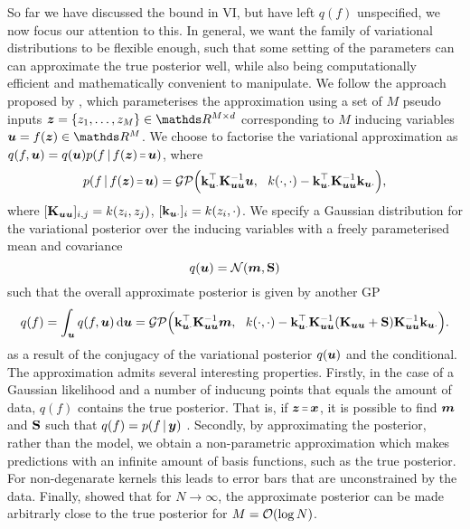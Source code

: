 So far we have discussed the bound in VI, but have left $q(f)$ unspecified, we now focus our attention to this. In general, we want the family of variational distributions to be flexible enough, such that some setting of the parameters can can approximate the true posterior well, while also being computationally efficient and mathematically convenient to manipulate. %
We follow the approach proposed by \citet{titsias2009}, which parameterises the approximation using a set of $M$ pseudo inputs $\vz = \{z_1, \ldots, z_M\} \in \Reals^{M \times d}$ corresponding to $M$ inducing variables $\vu = f(\vz) \in \Reals^M$. 
We choose to factorise the variational approximation as $q(f, \vu) = q(\vu) p(f\given f(\vz) \shorteq \vu)$, where
\begin{equation}
  p(f \given f(\vz) \shorteq \vu) = \GP\Big(\kux^\top \Kuu^{-1}\vu,\ \ k(\cdot, \cdot) -  \kux^\top \Kuu^{-1} \kux\Big), 
\end{equation}
where $[\mathbf{{K}}_{\bm{u} \bm{u}}]_{i,j} = k(z_i, z_j)$, $[\mathbf{k}_{\bm{u} \cdot}]_i = k(z_i, \cdot)$. We specify a Gaussian distribution for the variational posterior over the inducing variables with a freely parameterised mean and covariance
\begin{equation}
  q(\vu) = \NormDist{\vm, \MS}
\end{equation}
such that the overall approximate posterior is given by another GP
\begin{equation}
  q(f) = \int_{\bm{u}} q(f, \bm{u})\,\mathrm{d}{\bm{u}} = \mathcal{GP}\Big(\mathbf{k}_{\bm{u} \cdot}^\top \mathbf{{K}}_{\bm{u} \bm{u}}^{-1}\bm{m},\ \ k(\cdot, \cdot) -  \mathbf{k}_{\bm{u} \cdot}^\top \mathbf{{K}}_{\bm{u} \bm{u}}^{-1} (\mathbf{{K}}_{\bm{u} \bm{u}} + \mathbf{{S}})\mathbf{{K}}_{\bm{u} \bm{u}}^{-1} \mathbf{k}_{\bm{u} \cdot}\Big).
\end{equation}
as a result of the conjugacy of the variational posterior $q(\bm{u})$ and the conditional. 
The approximation admits several interesting properties. Firstly, in the case of a Gaussian likelihood and a number of inducung points that equals the amount of data, $q(f)$ contains the true posterior. That is, if $\vz \shorteq \vx$, it is possible to find $\bm{m}$ and $\mathbf{{S}}$ such that $q(f) = p(f \,|\, \bm{y})$ \citep{titsias2009}. Secondly, by approximating the posterior, rather than the model, we obtain a non-parametric approximation which makes predictions with an infinite amount of basis functions, such as the true posterior. For non-degenarate kernels this leads to error bars that are unconstrained by the data. Finally, \citet{burt2019} showed that for $N \rightarrow \infty$, the approximate posterior can be made arbitrarly close to the true posterior for $M = \mathcal{O}(\log N)$.

